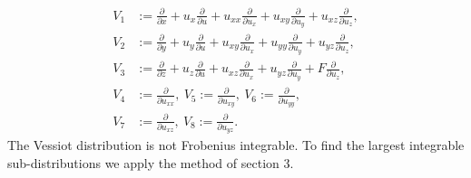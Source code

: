 \documentclass[a4paper, 11pt]{amsart}
\theoremstyle{definition}
\begin{document}
\begin{align}
V_1&:={\frac{\partial}{\partial{x}}}+u_{x}{\frac{\partial}{\partial{u}}}+u_{{x}{x}}{\frac{\partial}{\partial{u_{x}}}}+u_{xy}{\frac{\partial}{\partial{u_{y}}}}+u_{xz}{\frac{\partial}{\partial{u_{z}}}},\nonumber\\
V_2&:={\frac{\partial}{\partial{y}}}+u_{y}{\frac{\partial}{\partial{u}}}+u_{xy}{\frac{\partial}{\partial{u_{x}}}}+u_{yy}{\frac{\partial}{\partial{u_{y}}}}+u_{yz}{\frac{\partial}{\partial{u_{z}}}},\label{3Vessiot dist}\\
V_3&:={\frac{\partial}{\partial{z}}}+u_{z}{\frac{\partial}{\partial{u}}}+u_{xz}{\frac{\partial}{\partial{u_{x}}}}+u_{yz}{\frac{\partial}{\partial{u_{y}}}}+F{\frac{\partial}{\partial{u_{z}}}},\nonumber\\
V_4&:={\frac{\partial}{\partial{u_{{x}{x}}}}},~V_5:={\frac{\partial}{\partial{u_{xy}}}},~V_6:={\frac{\partial}{\partial{u_{yy}}}},\nonumber\\
V_7&:={\frac{\partial}{\partial{u_{xz}}}},~V_8:={\frac{\partial}{\partial{u_{yz}}}}.\nonumber
\end{align}
The Vessiot distribution is not Frobenius integrable. To find the largest integrable sub-distributions we apply the method of section $3$.
\end{document}
